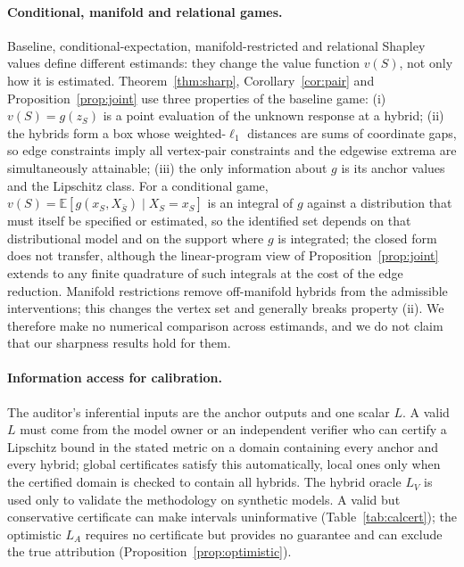 
\paragraph{Conditional, manifold and relational games.}
Baseline, conditional-expectation, manifold-restricted and relational Shapley values define different estimands:
they change the value function $v(S)$, not only how it is estimated. Theorem~\ref{thm:sharp}, Corollary~\ref{cor:pair}
and Proposition~\ref{prop:joint} use three properties of the baseline game: (i) $v(S)=g(z_S)$ is a point evaluation of the
unknown response at a hybrid; (ii) the hybrids form a box whose weighted-$\ell_1$ distances are sums of coordinate gaps,
so edge constraints imply all vertex-pair constraints and the edgewise extrema are simultaneously attainable; (iii) the
only information about $g$ is its anchor values and the Lipschitz class. For a conditional game,
$v(S)=\mathbb E[g(x_S,X_{\bar S})\mid X_S=x_S]$ is an integral of $g$ against a distribution that must itself be specified or
estimated, so the identified set depends on that distributional model and on the support where $g$ is integrated;
the closed form does not transfer, although the linear-program view of Proposition~\ref{prop:joint} extends to any finite
quadrature of such integrals at the cost of the edge reduction. Manifold restrictions remove off-manifold hybrids from
the admissible interventions; this changes the vertex set and generally breaks property (ii). We therefore make no
numerical comparison across estimands, and we do not claim that our sharpness results hold for them.

\paragraph{Information access for calibration.}
The auditor's inferential inputs are the anchor outputs and one scalar $L$. A valid $L$ must come from the model owner or
an independent verifier who can certify a Lipschitz bound in the stated metric on a domain containing every anchor and
every hybrid; global certificates satisfy this automatically, local ones only when the certified domain is checked to
contain all hybrids. The hybrid oracle $L_V$ is used only to validate the methodology on synthetic models. A valid but
conservative certificate can make intervals uninformative (Table~\ref{tab:calcert}); the optimistic $L_A$ requires no
certificate but provides no guarantee and can exclude the true attribution (Proposition~\ref{prop:optimistic}).

